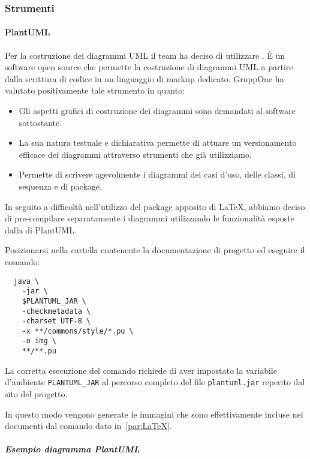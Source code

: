 \documentclass[../../norme-di-progetto.tex]{subfiles}
\begin{document}
\subsubsection{Strumenti}%
\label{subs:strumenti}

\paragraph{PlantUML}%
\label{par:plantuml}
Per la costruzione dei diagrammi UML il team ha deciso di utilizzare \@.
È un software open source che permette la costruzione di diagrammi UML a partire dalla scrittura di codice in un linguaggio di markup dedicato. GruppOne ha valutato positivamente tale strumento in quanto:

\begin{itemize}
  \item Gli aspetti grafici di costruzione dei diagrammi sono demandati al software sottostante.
  \item La sua natura testuale e dichiarativa permette di attuare un versionamento efficace dei diagrammi attraverso strumenti che già utilizziamo.
  \item Permette di scrivere agevolmente i diagrammi dei casi d'uso, delle classi, di sequenza e di package.
\end{itemize}

In seguito a difficoltà nell'utilizzo del package apposito di \LaTeX{}, abbiamo deciso di pre-compilare separatamente i diagrammi utilizzando le funzionalità esposte dalla  di PlantUML\@.

Posizionarsi nella cartella contenente la documentazione di progetto ed eseguire il comando:

\begin{verbatim}
  java \
    -jar \
    $PLANTUML_JAR \
    -checkmetadata \
    -charset UTF-8 \
    -x **/commons/style/*.pu \
    -o img \
    **/**.pu
\end{verbatim}

La corretta esecuzione del comando richiede di aver impostato la variabile d'ambiente \verb|PLANTUML_JAR| al percorso completo del file \verb|plantuml.jar| reperito dal sito del progetto.

In questo modo vengono generate le immagini che sono effettivamente incluse nei documenti dal comando dato in~\ref{par:LaTeX}.

\subparagraph{Esempio diagramma PlantUML}%
\label{subp:esempio_diagramma_plantuml}
\end{document}
